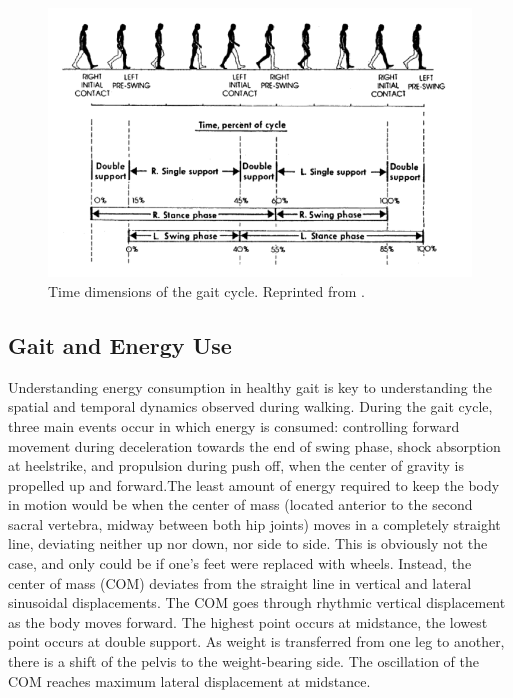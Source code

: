 \documentclass[11pt, oneside]{report}
\begin{document}
\begin{figure}
  \centering
    \includegraphics[scale=1.2]{gait_cycle}
  \caption{Time dimensions of the gait cycle. Reprinted from \cite{Inman1981}.}
  \label{fig:gait_cycle}
\end{figure}

\subsection{Gait and Energy Use}

Understanding energy consumption in healthy gait is key to understanding the spatial and temporal dynamics observed during walking. During the gait cycle, three main events occur in which energy is consumed: controlling forward movement during deceleration towards the end of swing phase, shock absorption at heelstrike, and propulsion during push off, when the center of gravity is propelled up and forward\cite{Inman1981}.The least amount of energy required to keep the body in motion would be when the center of mass (located anterior to the second sacral vertebra, midway between both hip joints) moves in a completely straight line, deviating neither up nor down, nor side to side\cite{Inman1981}. This is obviously not the case, and only could be if one's feet were replaced with wheels. Instead, the center of mass (COM) deviates from the straight line in vertical and lateral sinusoidal displacements\cite{Inman1981}. The COM goes through rhythmic vertical displacement as the body moves forward. The highest point occurs at midstance, the lowest point occurs at double support. As weight is transferred from one leg to another, there is a shift of the pelvis to the weight-bearing side. The oscillation of the COM reaches maximum lateral displacement at midstance\cite{Inman1981}.
\end{document}
